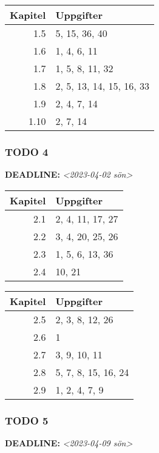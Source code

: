 \documentclass[11pt]{article}
\begin{document}
\begin{center}
\begin{tabular}{rl}
Kapitel & Uppgifter\\[0pt]
\hline
1.5 & 5, 15, 36, 40\\[0pt]
1.6 & 1, 4, 6, 11\\[0pt]
1.7 & 1, 5, 8, 11, 32\\[0pt]
1.8 & 2, 5, 13, 14, 15, 16, 33\\[0pt]
1.9 & 2, 4, 7, 14\\[0pt]
1.10 & 2, 7, 14\\[0pt]
\end{tabular}
\end{center}


\subsubsection{{\bfseries\sffamily TODO} 4}
\label{sec:org92747e9}
\noindent\textbf{DEADLINE:} \textit{<2023-04-02 sön>}\\[0pt]

\begin{center}
\begin{tabular}{rl}
Kapitel & Uppgifter\\[0pt]
\hline
2.1 & 2, 4, 11, 17, 27\\[0pt]
2.2 & 3, 4, 20, 25, 26\\[0pt]
2.3 & 1, 5, 6, 13, 36\\[0pt]
2.4 & 10, 21\\[0pt]
\end{tabular}
\end{center}


\begin{center}
\begin{tabular}{rl}
Kapitel & Uppgifter\\[0pt]
\hline
2.5 & 2, 3, 8, 12, 26\\[0pt]
2.6 & 1\\[0pt]
2.7 & 3, 9, 10, 11\\[0pt]
2.8 & 5, 7, 8, 15, 16, 24\\[0pt]
2.9 & 1, 2, 4, 7, 9\\[0pt]
\end{tabular}
\end{center}


\subsubsection{{\bfseries\sffamily TODO} 5}
\label{sec:orgbc3c35e}
\noindent\textbf{DEADLINE:} \textit{<2023-04-09 sön>}\\[0pt]
\end{document}

